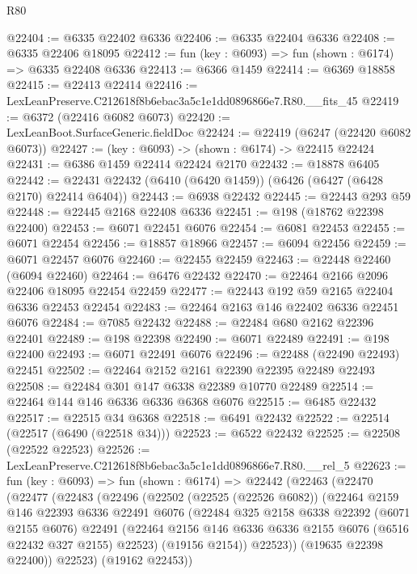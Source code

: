 \begin{lexlean}{R80}
\begin{coremodule}
@22404 := @6335 @22402 @6336
@22406 := @6335 @22404 @6336
@22408 := @6335 @22406 @18095
@22412 := fun (key : @6093) => fun (shown : @6174) => @6335 @22408 @6336
@22413 := @6366 @1459
@22414 := @6369 @18858
@22415 := @22413 @22414
@22416 := LexLeanPreserve.C212618f8b6ebac3a5c1e1dd0896866e7.R80.__fits_45
@22419 := @6372 (@22416 @6082 @6073)
@22420 := LexLeanBoot.SurfaceGeneric.fieldDoc
@22424 := @22419 (@6247 (@22420 @6082 @6073))
@22427 := (key : @6093) -> (shown : @6174) -> @22415 @22424
@22431 := @6386 @1459 @22414 @22424 @2170
@22432 := @18878 @6405
@22442 := @22431 @22432 (@6410 (@6420 @1459)) (@6426 (@6427 (@6428 @2170) @22414 @6404))
@22443 := @6938 @22432
@22445 := @22443 @293 @59
@22448 := @22445 @2168 @22408 @6336
@22451 := @198 (@18762 @22398 @22400)
@22453 := @6071 @22451 @6076
@22454 := @6081 @22453
@22455 := @6071 @22454
@22456 := @18857 @18966
@22457 := @6094 @22456
@22459 := @6071 @22457 @6076
@22460 := @22455 @22459
@22463 := @22448 @22460 (@6094 @22460)
@22464 := @6476 @22432
@22470 := @22464 @2166 @2096 @22406 @18095 @22454 @22459
@22477 := @22443 @192 @59 @2165 @22404 @6336 @22453 @22454
@22483 := @22464 @2163 @146 @22402 @6336 @22451 @6076
@22484 := @7085 @22432
@22488 := @22484 @680 @2162 @22396 @22401
@22489 := @198 @22398
@22490 := @6071 @22489
@22491 := @198 @22400
@22493 := @6071 @22491 @6076
@22496 := @22488 (@22490 @22493) @22451
@22502 := @22464 @2152 @2161 @22390 @22395 @22489 @22493
@22508 := @22484 @301 @147 @6338 @22389 @10770 @22489
@22514 := @22464 @144 @146 @6336 @6336 @6368 @6076
@22515 := @6485 @22432
@22517 := @22515 @34 @6368
@22518 := @6491 @22432
@22522 := @22514 (@22517 (@6490 (@22518 @34)))
@22523 := @6522 @22432
@22525 := @22508 (@22522 @22523)
@22526 := LexLeanPreserve.C212618f8b6ebac3a5c1e1dd0896866e7.R80.__rel_5
@22623 := fun (key : @6093) =>
  fun (shown : @6174) =>
  @22442
    (@22463
      (@22470
        (@22477
          (@22483
            (@22496
              (@22502
                (@22525 (@22526 @6082))
                (@22464
                  @2159
                  @146
                  @22393
                  @6336
                  @22491
                  @6076
                  (@22484
                    @325
                    @2158
                    @6338
                    @22392
                    (@6071 @2155 @6076)
                    @22491
                    (@22464 @2156 @146 @6336 @6336 @2155 @6076 (@6516 @22432 @327 @2155) @22523)
                    (@19156 @2154))
                  @22523))
              (@19635 @22398 @22400))
            @22523)
          (@19162 @22453))

\end{coremodule}
\end{lexlean}
